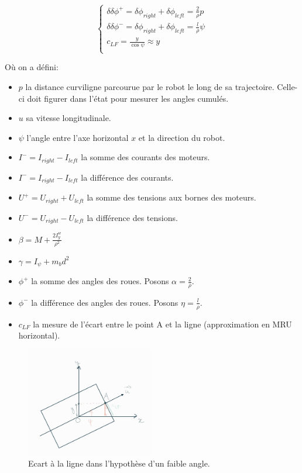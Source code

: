\documentclass{report}
\begin{document}
\begin{equation*}
    \begin{cases}
        \delta \delta \phi^{+} = \delta \phi_{right} + \delta \phi_{left} = \frac{2}{\rho}p \\
        \delta \delta \phi^{-} = \delta \phi_{right} + \delta \phi_{left} = \frac{l}{\rho}\psi \\
        c_{LF} = \frac{y}{\cos\psi} \approx y \\
    \end{cases}
\end{equation*}

Où on a défini:

\begin{itemize}
    \item $p$ la distance curviligne parcourue par le robot le long de sa trajectoire.
    Celle-ci doit figurer dans l'état pour mesurer les angles cumulés.
    \item $u$ sa vitesse longitudinale.
    \item $\psi$ l'angle entre l'axe horizontal $x$ et la direction du robot.
    \item $I^{-} = I_{right} - I_{left}$ la somme des courants des moteurs.
    \item $I^{-} = I_{right} - I_{left}$ la différence des courants.
    \item $U^{+} = U_{right} + U_{left}$ la somme des tensions aux bornes des moteurs.
    \item $U^{-} = U_{right} - U_{left}$ la différence des tensions.
    \item $\beta = M + \frac{2I^{w}_{y}}{\rho^2}$
    \item $\gamma = I_{\psi} + m_bd^2$
    \item $\phi^{+}$ la somme des angles des roues. Posons $\alpha = \frac{2}{\rho}$.
    \item $\phi^{-}$ la différence des angles des roues. Posons  $\eta = \frac{l}{\rho}$.
    \item $c_{LF}$ la mesure de l'écart entre le point A et la ligne (approximation en MRU horizontal).
\end{itemize}


\begin{figure}[h]  %
    \centering
    \includegraphics[width=0.5\textwidth]{figures/cLF_schema.jpg}
    \caption{Ecart à la ligne dans l'hypothèse d'un faible angle.}
\end{figure}
\end{document}
